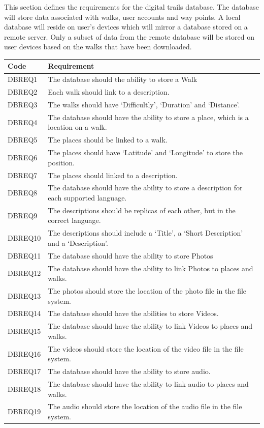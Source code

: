 \documentclass[11pt,a4paper]{article}
\begin{document}
This section defines the requirements for the digital trails database.
The database will store data associated with walks, user accounts and way points.
A local database will reside on user's devices which will mirror a database stored on a remote server.
Only a subset of data from the remote database will be stored on user devices based on the walks that have been downloaded.

\begin{longtable}{|p{2.5cm}p{13cm}|}
\hline
\textbf{Code} & \textbf{Requirement} \\
\hline
DBREQ1 & The database should the ability to store a Walk\\ \hline
DBREQ2 & Each walk should link to a description.  \\ \hline
DBREQ3 & The walks should have `Difficultly', `Duration' and `Distance'. \\ \hline
DBREQ4 & The database should have the ability to store a place, which is a location on a walk.\\ \hline
DBREQ5 & The places should be linked to a walk.\\ \hline
DBREQ6 & The places should have `Latitude' and `Longitude' to store the position. \\ \hline
DBREQ7 & The places should linked to a description. \\ \hline
DBREQ8 & The database should have the ability to store a description for each supported language. \\ \hline
DBREQ9 & The descriptions should be replicas of each other, but in the correct language. \\ \hline
DBREQ10 & The descriptions should include a `Title', a `Short Description' and a `Description'.\\ \hline
DBREQ11 & The database should have the ability to store Photos \\ \hline
DBREQ12 & The database should have the ability to link Photos to places and walks.\\ \hline
DBREQ13 & The photos should store the location of the photo file in the file system.\\ \hline
DBREQ14 & The database should have the abilities to store Videos. \\ \hline
DBREQ15 & The database should have the ability to link Videos to places and walks.\\ \hline
DBREQ16 & The videos should store the location of the video file in the file system.\\ \hline
DBREQ17 & The database should have the ability to store audio. \\ \hline
DBREQ18 & The database should have the ability to link audio to places and walks.\\ \hline
DBREQ19 & The audio should store the location of the audio file in the file system.\\ \hline

\end{longtable}
\end{document}
